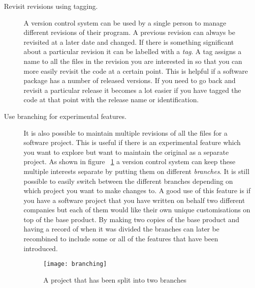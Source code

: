 \begin{description}

  \item [Revisit revisions using tagging.]
  A version control system can be used by a single person to manage different revisions of their program. A previous revision can always be revisited at a later date and changed. If there is something significant about a particular revision it can be labelled with a \emph{tag}. A tag assigns a name to all the files in the revision you are interested in so that you can more easily revisit the code at a certain point.  This is helpful if a software package has a number of released versions.  If you need to go back and revisit a particular release it becomes a lot easier if you have tagged the code at that point with the release name or identification.
   
   

  
  \item [Use branching for experimental features.] 
  It is also possible to maintain multiple revisions of all the files for a software project. This is useful if there is an experimental feature which you want to explore but want to maintain the original as a separate project. As shown in figure ~\ref{fig:bgBranches} a version control system can keep these multiple interests separate by putting them on different \emph{branches}.  It is still possible to easily switch between the different branches depending on which project you want to make changes to.  A good use of this feature is if you have a software project that you have written on behalf two different companies but each of them would like their own unique customisations on top of the base product.  By making two copies of the base product and having a record of when it was divided the branches can later be recombined to include some or all of the features that have been introduced.

  \begin{figure}[h]
   \begin{center}
    \texttt{[image: branching]}
   \end{center}
   \caption{A project that has been split into two branches}
   \label{fig:bgBranches}
  \end{figure}


\end{description}
